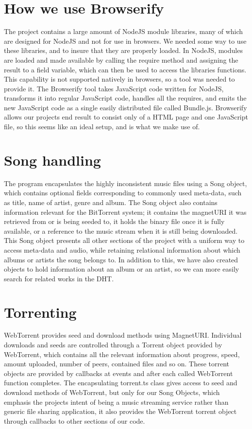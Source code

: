 \section{How we use Browserify}
The project contains a large amount of NodeJS module libraries, 
many of which are designed for NodeJS and not for use in browsers.
We needed some way to use these libraries, and to insure that they are properly loaded.
In NodeJS, modules are loaded and made available by calling the require method 
and assigning the result to a field variable, which can then be used to access the libraries functions.
This capability is not supported natively in browsers, so a tool was needed to provide it.
The Browserify tool takes JavaScript code written for NodeJS, 
transforms it into regular JavaScript code, 
handles all the requires, 
and emits the new JavaScript code as a single easily distributed file called Bundle.js.
Browserify allows our projects end result to consist only of a \acs{HTML} page and one JavaScript file, 
so this seems like an ideal setup, and is what we make use of.
\newline

\section{Song handling}
The program encapsulates the highly inconsistent music files using a Song object,
which contains optional fields corresponding to commonly used meta-data, 
such as title, name of artist, genre and album. 
The Song object also contains information relevant for the BitTorrent system; 
it contains the magnetURI it was retrieved from or is being seeded to, 
it holds the binary file once it is fully available, 
or a reference to the music stream when it is still being downloaded.
This Song object presents all other sections of the project with a uniform way to access meta-data and audio, 
while retaining relational information about which albums or artists the song belongs to. In addition to this, 
we have also created objects to hold information about an album or an artist, 
so we can more easily search for related works in the \acs{DHT}.
\newline

\section{Torrenting}
WebTorrent provides seed and download methods using MagnetURI.
Individual downloads and seeds are controlled through a Torrent object provided by WebTorrent,
which contains all the relevant information about progress, 
speed, amount uploaded, number of peers, contained files and so on.
These torrent objects are provided by callbacks at events
and after each called WebTorrent function completes.
The encapsulating torrent.ts class gives access to seed and download methods of WebTorrent, 
but only for our Song Objects, which emphasis the projects intent of being a music streaming service 
rather than generic file sharing application, 
it also provides the WebTorrent torrent object through callbacks to other sections of our code.
\newline

